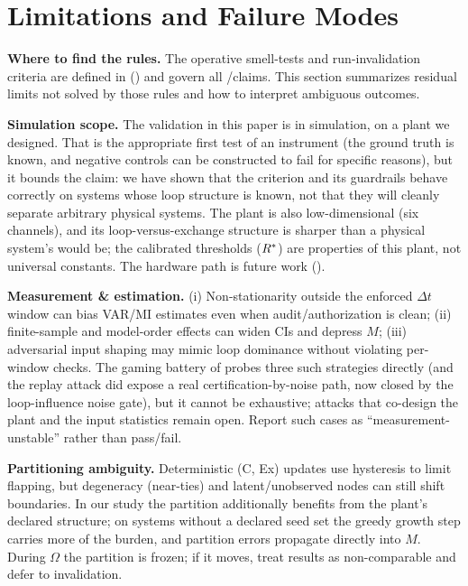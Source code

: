 \documentclass[11pt]{article}
\begin{document}
\section{Limitations and Failure Modes}
\label{sec:limitations}

\textbf{Where to find the rules.} The operative smell-tests and run-invalidation criteria are defined in  () and govern all \NC/\SC claims. This section summarizes residual limits not solved by those rules and how to interpret ambiguous outcomes.

\textbf{Simulation scope.} The validation in this paper is in simulation, on a plant we designed. That is the appropriate first test of an instrument (the ground truth is known, and negative controls can be constructed to fail for specific reasons), but it bounds the claim: we have shown that the criterion and its guardrails behave correctly on systems whose loop structure is known, not that they will cleanly separate arbitrary physical systems. The plant is also low-dimensional (six channels), and its loop-versus-exchange structure is sharper than a physical system's would be; the calibrated thresholds ($R^*$) are properties of this plant, not universal constants. The hardware path is future work ().

\textbf{Measurement \& estimation.} (i) Non-stationarity outside the enforced $\Delta t$ window can bias VAR/MI estimates even when audit/authorization is clean; (ii) finite-sample and model-order effects can widen CIs and depress $M$; (iii) adversarial input shaping may mimic loop dominance without violating per-window checks. The gaming battery of  probes three such strategies directly (and the replay attack did expose a real certification-by-noise path, now closed by the loop-influence noise gate), but it cannot be exhaustive; attacks that co-design the plant and the input statistics remain open. Report such cases as ``measurement-unstable'' rather than pass/fail.

\textbf{Partitioning ambiguity.} Deterministic (C, Ex) updates use hysteresis to limit flapping, but degeneracy (near-ties) and latent/unobserved nodes can still shift boundaries. In our study the partition additionally benefits from the plant's declared structure; on systems without a declared seed set the greedy growth step carries more of the burden, and partition errors propagate directly into $M$. During $\Omega$ the partition is frozen; if it moves, treat results as non-comparable and defer to  invalidation.
\end{document}
